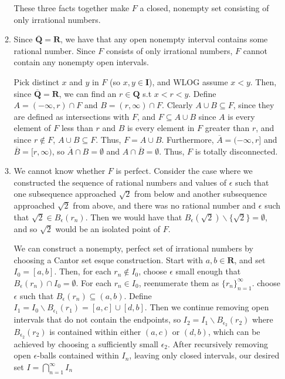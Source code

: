 \documentclass{article}
\begin{document}
\begin{enumerate}
\begin{enumerate}
        \smallskip

        These three facts together make $F$ a closed, nonempty set consisting of only irrational numbers. 

        \item Since $\overline{\mathbf{Q}} = \mathbf{R}$, we have that any open nonempty interval contains some rational number. Since $F$ consists of only irrational numbers, $F$ cannot contain any nonempty open intervals. 

        \smallskip

        Pick distinct $x$ and $y$ in $F$ (so $x, y \in \mathbf{I}$), and WLOG assume $x < y$. Then, since $\overline{\mathbf{Q}} = \mathbf{R}$, we can find an $r \in \mathbf{Q}$ s.t $x < r < y$. Define $A = (-\infty, r) \cap F$ and $B = (r, \infty) \cap F$. Clearly $A \cup B \subseteq F$, since they are defined as intersections with $F$, and $F \subseteq A \cup B$ since $A$ is every element of $F$ less than $r$ and $B$ is every element in $F$ greater than $r$, and since $r \notin F$, $A \cup B \subseteq F$. Thus, $F = A \cup B$. Furthermore, $\overline{A} = (-\infty, r]$ and $\overline{B} = [r, \infty)$, so $\overline{A} \cap B = \emptyset$ and $A \cap \overline{B} = \emptyset$. Thus, $F$ is totally disconnected. 

        \item We cannot know whether $F$ is perfect. Consider the case where we constructed the sequence of rational numbers and values of $\epsilon$ such that one subsequence approached $\sqrt{2}$ from below and another subsequence approached $\sqrt{2}$ from above, and there was no rational number and $\epsilon$ such that $\sqrt{2} \in B_\epsilon(r_n)$. Then we would have that $B_\epsilon(\sqrt{2}) \backslash \{\sqrt{2}\} = \emptyset$, and so $\sqrt{2}$ would be an isolated point of $F$. 

        \smallskip

        We can construct a nonempty, perfect set of irrational numbers by choosing a Cantor set esque construction. Start with $a, b \in \mathbf{R}$, and set $I_0 = [a, b]$. Then, for each $r_n \notin I_0$, choose $\epsilon$ small enough that $B_\epsilon(r_n) \cap I_0 = \emptyset$. For each $r_n \in I_0$, reenumerate them as $\{r_n\}_{n=1}^\infty. $ choose $\epsilon$ such that $B_\epsilon(r_n) \subseteq (a, b)$. Define $I_1 = I_0 \backslash B_{\epsilon_1}(r_1) = [a, c] \cup [d, b]$. Then we continue removing open intervals that do not contain the endpoints, so $I_2 = I_1 \backslash B_{\epsilon_2}(r_2)$ where $B_{\epsilon_2}(r_2)$ is contained within either $(a, c)$ or $(d, b)$, which can be achieved by choosing a sufficiently small $\epsilon_2$. After recursively removing open $\epsilon$-balls contained within $I_n$, leaving only closed intervals, our desired set $I = \bigcap_{n=1}^\infty I_n$


\end{enumerate}
\end{enumerate}
\end{document}
